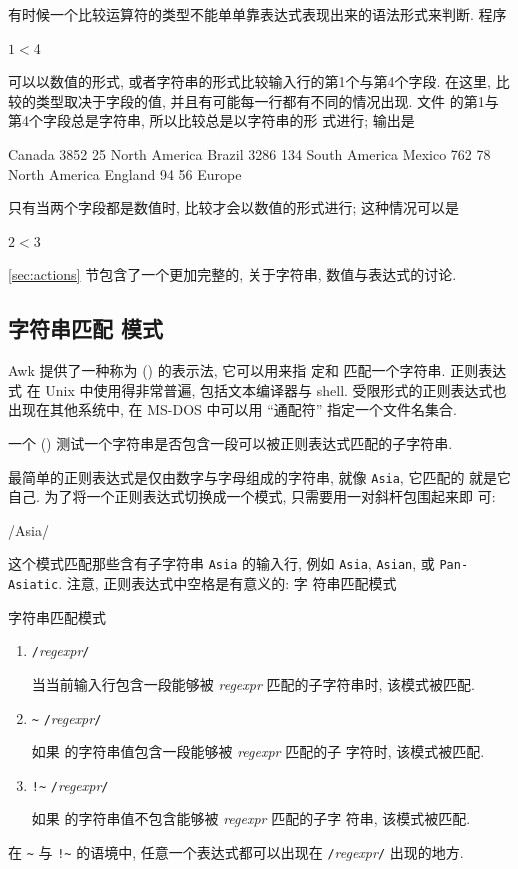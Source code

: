 有时候一个比较运算符的类型不能单单靠表达式表现出来的语法形式来判断. 程序
\begin{awkcode}
    $1 < $4
\end{awkcode}
可以以数值的形式, 或者字符串的形式比较输入行的第1个与第4个字段. 在这里,
比较的类型取决于字段的值, 并且有可能每一行都有不同的情况出现. 文件
 的第1与第4个字段总是字符串, 所以比较总是以字符串的形
式进行; 输出是
\begin{file}
    Canada      3852    25      North America
    Brazil      3286    134     South America
    Mexico      762     78      North America
    England     94      56      Europe
\end{file}
只有当两个字段都是数值时, 比较才会以数值的形式进行; 这种情况可以是
\begin{awkcode}
    $2 < $3
\end{awkcode}

\ref{sec:actions} 节包含了一个更加完整的, 关于字符串, 数值与表达式的讨论.

\subsection{字符串匹配 模式}
\label{subsec:string_matching_pattern}

Awk 提供了一种称为  (\regexpr) 的表示法, 它可以用来指
定和
匹配一个字符串.  正则表达式 在 Unix 中使用得非常普遍, 包括文本编译器与
shell. 受限形式的正则表达式也出现在其他系统中, 在 MS-DOS 中可以用
``通配符'' 指定一个文件名集合.

一个  ()
测试一个字符串是否包含一段可以被正则表达式匹配的子字符串.

最简单的正则表达式是仅由数字与字母组成的字符串, 就像 \verb'Asia', 它匹配的
就是它自己. 为了将一个正则表达式切换成一个模式, 只需要用一对斜杆包围起来即
可:
\begin{awkcode}
    /Asia/
\end{awkcode}
这个模式匹配那些含有子字符串 \verb'Asia' 的输入行, 例如 \verb'Asia',
\verb'Asian', 或 \verb'Pan-Asiatic'. 注意, 正则表达式中空格是有意义的: 字
符串匹配模式
\begin{summary}{字符串匹配模式}
    \begin{enumerate}
        \item \verb'/'\textit{regexpr}\verb'/' \par
            当当前输入行包含一段能够被 \textit{regexpr} 匹配的子字符串时,
            该模式被匹配.
        \item \regexpr {} \verb'~' \verb'/'\textit{regexpr}\verb'/' \par
            如果 \expr 的字符串值包含一段能够被 \textit{regexpr} 匹配的子
            字符时, 该模式被匹配.
        \item \expr {} \verb'!~' \verb'/'\textit{regexpr}\verb'/' \par
            如果 \expr 的字符串值不包含能够被 \textit{regexpr} 匹配的子字
            符串, 该模式被匹配.
    \end{enumerate}
    在 \verb'~' 与 \verb'!~' 的语境中, 任意一个表达式都可以出现在
    \verb'/'\textit{regexpr}\verb'/' 出现的地方.
\end{summary}

